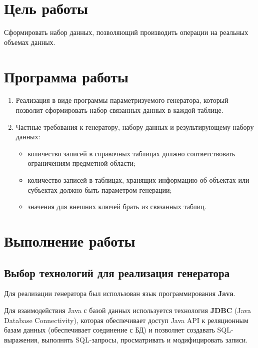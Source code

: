 





\tableofcontents
\newpage

\section{Цель работы}

Сформировать набор данных, позволяющий производить операции на реальных объемах данных.

\section{Программа работы}

\begin{enumerate}
	\item Реализация в виде программы параметризуемого генератора, который позволит сформировать набор связанных данных в каждой таблице.
	\item Частные требования к генератору, набору данных и результирующему набору данных:
		\begin{itemize}[topsep=0em]
			\item количество записей в справочных таблицах должно соответствовать ограничениям предметной области;
			\item количество записей в таблицах, хранящих информацию об объектах или субъектах должно быть параметром генерации;
			\item значения для внешних ключей брать из связанных таблиц.
		\end{itemize}
\end{enumerate}

\section{Выполнение работы}

\subsection{Выбор технологий для реализация генератора}

Для реализации генератора был использован язык программирования \textbf{Java}. 

Для взаимодействия Java с базой данных используется технология \textbf{JDBC} (Java Database Connectivity), которая обеспечивает доступ Java API к реляционным базам данных (обеспечивает соединение с БД) и позволяет создавать SQL-выражения, выполнять SQL-запросы, просматривать и модифицировать записи. 

